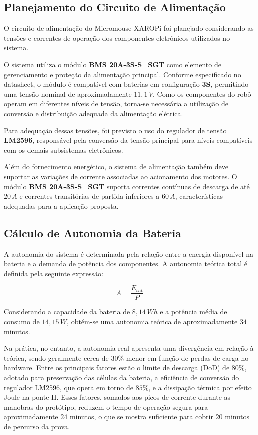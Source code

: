 \subsection{Planejamento do Circuito de Alimentação}

O circuito de alimentação do Micromouse XAROPi foi planejado considerando as tensões e correntes de operação dos componentes eletrônicos utilizados no sistema.

O sistema utiliza o módulo \textbf{BMS 20A-3S-S\_SGT} como elemento de gerenciamento e proteção da alimentação principal. Conforme especificado no datasheet, o módulo é compatível com baterias em configuração \textbf{3S}, permitindo uma tensão nominal de aproximadamente $11,1\,V$.
Como os componentes do robô operam em diferentes níveis de tensão, torna-se necessária a utilização de conversão e distribuição adequada da alimentação elétrica. 

Para adequação dessas tensões, foi previsto o uso do regulador de tensão \textbf{LM2596}, responsável pela conversão da tensão principal para níveis compatíveis com os demais subsistemas eletrônicos.

Além do fornecimento energético, o sistema de alimentação também deve suportar as variações de corrente associadas ao acionamento dos motores. O módulo \textbf{BMS 20A-3S-S\_SGT} suporta correntes contínuas de descarga de até $20\,A$ e correntes transitórias de partida inferiores a $60\,A$, características adequadas para a aplicação proposta.

\subsection{Cálculo de Autonomia da Bateria}

A autonomia do sistema é determinada pela relação entre a energia disponível na bateria e a demanda de potência dos componentes. A autonomia teórica total é definida pela seguinte expressão:

\[
A = \frac{E_{bat}}{P}
\]

Considerando a capacidade da bateria de $8,14\,Wh$ e a potência média de consumo de $14,15\,W$, obtém-se uma autonomia teórica de aproximadamente $34$ minutos.

Na prática, no entanto, a autonomia real apresenta uma divergência em relação à teórica, sendo geralmente cerca de $30\%$ menor em função de perdas de carga no hardware. Entre os principais fatores estão o limite de descarga (DoD) de $80\%$, adotado para preservação das células da bateria, a eficiência de conversão do regulador LM2596, que opera em torno de $85\%$, e a dissipação térmica por efeito Joule na ponte H. Esses fatores, somados aos picos de corrente durante as manobras do protótipo, reduzem o tempo de operação segura para aproximadamente $24$ minutos, o que se mostra suficiente para cobrir $20$ minutos de percurso da prova.



